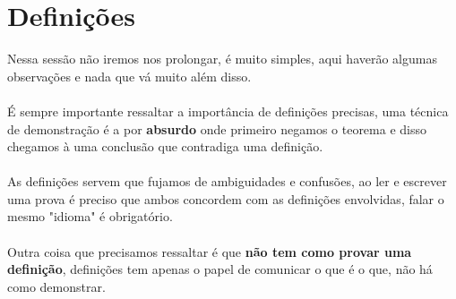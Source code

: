 \documentclass[a4paper,11pt,oneside]{book}
\theoremstyle{definition}
\theoremstyle{break}
\begin{document}
\section{Definições}
Nessa sessão não iremos nos prolongar, é muito simples, aqui haverão algumas observações e nada que vá muito além disso.
\\ \\
É sempre importante ressaltar a importância de definições precisas, uma técnica de demonstração é a por \textbf{absurdo} onde primeiro negamos o teorema e disso chegamos à uma conclusão que contradiga uma definição.
\\ \\
As definições servem que fujamos de ambiguidades e confusões, ao ler e escrever uma prova é preciso que ambos concordem com as definições envolvidas, falar o mesmo "idioma" é obrigatório.
\\ \\
Outra coisa que precisamos ressaltar é que \textbf{não tem como provar uma definição}, definições tem apenas o papel de comunicar o que é o que, não há como demonstrar.
\end{document}
